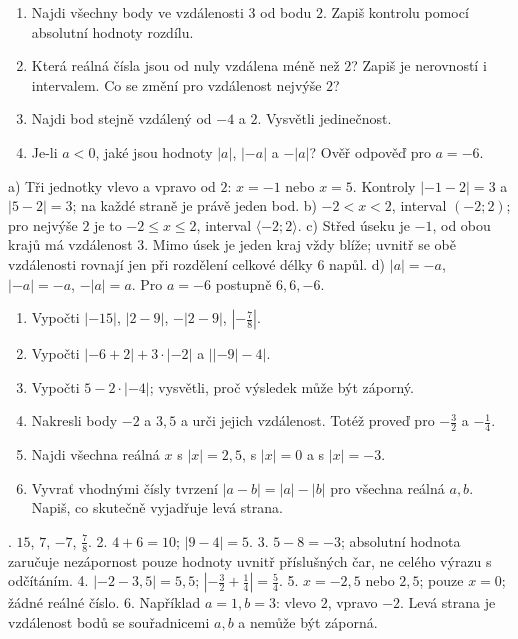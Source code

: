 \documentclass[11pt,a4paper]{article}
\begin{document}
\newpage
{}
\begin{zadaniReseniBox}[title={Rozšíření 1},breakable=false]
\begin{enumerate}[label=\alph*)]
\item Najdi všechny body ve vzdálenosti $3$ od bodu $2$.
Zapiš kontrolu pomocí absolutní hodnoty rozdílu.
\item Která reálná čísla jsou od nuly vzdálena méně než $2$?
Zapiš je nerovností i intervalem. Co se změní pro vzdálenost nejvýše $2$?
\item Najdi bod stejně vzdálený od $-4$ a $2$. Vysvětli jedinečnost.
\item Je-li $a<0$, jaké jsou hodnoty $|a|$, $|-a|$ a $-|a|$?
Ověř odpověď pro $a=-6$.
\end{enumerate}
\tcblower
a) Tři jednotky vlevo a vpravo od $2$: $x=-1$ nebo $x=5$.
Kontroly $|-1-2|=3$ a $|5-2|=3$; na každé straně je právě jeden bod.
b) $-2<x<2$, interval $(-2;2)$; pro nejvýše $2$ je to
$-2\le x\le2$, interval $\langle-2;2\rangle$.
c) Střed úseku je $-1$, od obou krajů má vzdálenost $3$.
Mimo úsek je jeden kraj vždy blíže; uvnitř se obě vzdálenosti rovnají
jen při rozdělení celkové délky $6$ napůl.
d) $|a|=-a$, $|-a|=-a$, $-|a|=a$. Pro $a=-6$ postupně $6,6,-6$.
\end{zadaniReseniBox}

\begin{zadaniReseniBox}[title={Domácí úkol},breakable=false]
\begin{enumerate}[label=\arabic*)]
\item Vypočti $|-15|$, $|2-9|$, $-|2-9|$, $|-\frac78|$.
\item Vypočti $|-6+2|+3\cdot|-2|$ a $\bigl||-9|-4\bigr|$.
\item Vypočti $5-2\cdot|-4|$; vysvětli, proč výsledek může být záporný.
\item Nakresli body $-2$ a $3{,}5$ a urči jejich vzdálenost.
Totéž proveď pro $-\frac32$ a $-\frac14$.
\item Najdi všechna reálná $x$ s $|x|=2{,}5$, s $|x|=0$ a s $|x|=-3$.
\item Vyvrať vhodnými čísly tvrzení $|a-b|=|a|-|b|$ pro všechna reálná
$a,b$. Napiš, co skutečně vyjadřuje levá strana.
\end{enumerate}
. $15$, $7$, $-7$, $\frac78$.
2. $4+6=10$; $|9-4|=5$.
3. $5-8=-3$; absolutní hodnota zaručuje nezápornost pouze hodnoty uvnitř
příslušných čar, ne celého výrazu s odčítáním.
4. $|-2-3{,}5|=5{,}5$; $|-\frac32+\frac14|=\frac54$.
5. $x=-2{,}5$ nebo $2{,}5$; pouze $x=0$; žádné reálné číslo.
6. Například $a=1,b=3$: vlevo $2$, vpravo $-2$. Levá strana je vzdálenost
bodů se souřadnicemi $a,b$ a nemůže být záporná.
\end{zadaniReseniBox}
\end{document}

